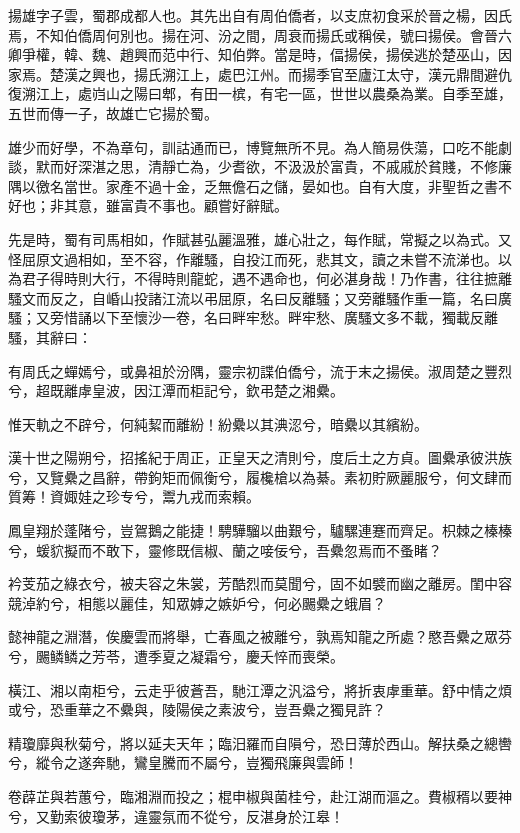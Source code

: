 
\begin{pinyinscope}
揚雄字子雲，蜀郡成都人也。其先出自有周伯僑者，以支庶初食采於晉之楊，因氏焉，不知伯僑周何別也。揚在河、汾之間，周衰而揚氏或稱侯，號曰揚侯。會晉六卿爭權，韓、魏、趙興而范中行、知伯弊。當是時，偪揚侯，揚侯逃於楚巫山，因家焉。楚漢之興也，揚氏溯江上，處巴江州。而揚季官至廬江太守，漢元鼎間避仇復溯江上，處岿山之陽曰郫，有田一槟，有宅一區，世世以農桑為業。自季至雄，五世而傳一子，故雄亡它揚於蜀。

雄少而好學，不為章句，訓詁通而已，博覽無所不見。為人簡易佚蕩，口吃不能劇談，默而好深湛之思，清靜亡為，少耆欲，不汲汲於富貴，不戚戚於貧賤，不修廉隅以徼名當世。家產不過十金，乏無儋石之儲，晏如也。自有大度，非聖哲之書不好也；非其意，雖富貴不事也。顧嘗好辭賦。

先是時，蜀有司馬相如，作賦甚弘麗溫雅，雄心壯之，每作賦，常擬之以為式。又怪屈原文過相如，至不容，作離騷，自投江而死，悲其文，讀之未嘗不流涕也。以為君子得時則大行，不得時則龍蛇，遇不遇命也，何必湛身哉！乃作書，往往摭離騷文而反之，自崏山投諸江流以弔屈原，名曰反離騷；又旁離騷作重一篇，名曰廣騷；又旁惜誦以下至懷沙一卷，名曰畔牢愁。畔牢愁、廣騷文多不載，獨載反離騷，其辭曰：

有周氏之蟬嫣兮，或鼻祖於汾隅，靈宗初諜伯僑兮，流于末之揚侯。淑周楚之豐烈兮，超既離虖皇波，因江潭而柜記兮，欽弔楚之湘纍。

惟天軌之不辟兮，何純絜而離紛！紛纍以其淟涊兮，暗纍以其繽紛。

漢十世之陽朔兮，招搖紀于周正，正皇天之清則兮，度后土之方貞。圖纍承彼洪族兮，又覽纍之昌辭，帶鉤矩而佩衡兮，履欃槍以為綦。素初貯厥麗服兮，何文肆而質筹！資娵娃之珍专兮，鬻九戎而索賴。

鳳皇翔於蓬陼兮，豈鴐鵝之能捷！騁驊騮以曲艱兮，驢騾連蹇而齊足。枳棘之榛榛兮，蝯貁擬而不敢下，靈修既信椒、蘭之唼佞兮，吾纍忽焉而不蚤睹？

衿芰茄之綠衣兮，被夫容之朱裳，芳酷烈而莫聞兮，固不如襞而幽之離房。閨中容競淖約兮，相態以麗佳，知眾嫭之嫉妒兮，何必颺纍之蛾眉？

懿神龍之淵潛，俟慶雲而將舉，亡春風之被離兮，孰焉知龍之所處？愍吾纍之眾芬兮，颺鳞鳞之芳苓，遭季夏之凝霜兮，慶夭悴而喪榮。

橫江、湘以南柜兮，云走乎彼蒼吾，馳江潭之汎溢兮，將折衷虖重華。舒中情之煩或兮，恐重華之不纍與，陵陽侯之素波兮，豈吾纍之獨見許？

精瓊靡與秋菊兮，將以延夫天年；臨汨羅而自隕兮，恐日薄於西山。解扶桑之總轡兮，縱令之遂奔馳，鸞皇騰而不屬兮，豈獨飛廉與雲師！

卷薜芷與若蕙兮，臨湘淵而投之；棍申椒與菌桂兮，赴江湖而漚之。費椒稰以要神兮，又勤索彼瓊茅，違靈氛而不從兮，反湛身於江皋！


\end{pinyinscope}
